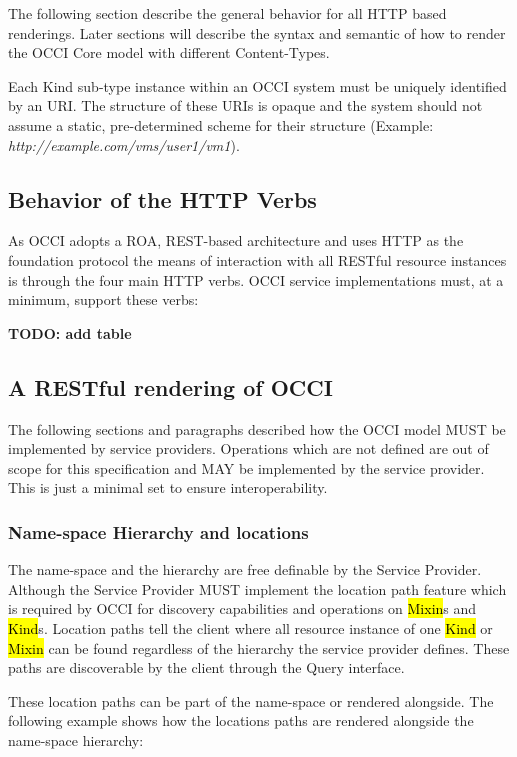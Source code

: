 \documentclass[10pt,a4paper]{article}
\begin{document}
The following section describe the general behavior for all HTTP based
renderings. Later sections will describe the syntax and semantic of
how to render the OCCI Core model with different Content-Types.

Each Kind sub-type instance within an OCCI system must be uniquely
identified by an URI. The structure of these URIs is opaque and the
system should not assume a static, pre-determined scheme for their
structure (Example: \emph{http://example.com/vms/user1/vm1}).

\subsection{Behavior of the HTTP Verbs}
As OCCI adopts a ROA, REST-based architecture and uses HTTP as the
foundation protocol the means of interaction with all RESTful resource
instances is through the four main HTTP verbs. OCCI service
implementations must, at a minimum, support these verbs:

\textbf{TODO: add table}

\subsection{A RESTful rendering of OCCI}
The following sections and paragraphs described how the OCCI model
MUST be implemented by service providers. Operations which are not
defined are out of scope for this specification and MAY be implemented
by the service provider. This is just a minimal set to ensure
interoperability.

\subsubsection{Name-space Hierarchy and locations}
The name-space and the hierarchy are free definable by the Service
Provider. Although the Service Provider MUST implement the location
path feature which is required by OCCI for discovery capabilities and
operations on \hl{Mixin}s and \hl{Kind}s. Location paths tell the
client where all resource instance of one \hl{Kind} or \hl{Mixin} can
be found regardless of the hierarchy the service provider
defines. These paths are discoverable by the client through the Query
interface.

These location paths can be part of the name-space or rendered
alongside. The following example shows how the locations paths are
rendered alongside the name-space hierarchy:
\end{document}
